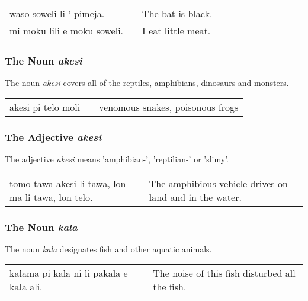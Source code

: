 \begin{supertabular}{p{5,5cm}|ll}
    waso soweli li ' pimeja.    &  & The bat is black.  \\
    mi moku lili e moku soweli. &  & I eat little meat. \\
\end{supertabular}

%
%
\subsubsection*{The Noun \textit{akesi}}
%
%
The noun \textit{akesi} covers all of the reptiles, amphibians, dinosaurs and monsters.

\begin{supertabular}{p{5,5cm}|ll}
    akesi pi telo moli &  & venomous snakes, poisonous frogs \\
\end{supertabular}

%
%
\subsubsection*{The Adjective \textit{akesi}}
%
%
The adjective \textit{akesi} means 'amphibian-', 'reptilian-' or 'slimy'.

\begin{supertabular}{p{5,5cm}|ll}
    tomo tawa akesi li tawa, lon ma li tawa, lon telo. &  & The amphibious vehicle drives on land and in the water. \\
\end{supertabular}

%
%
\subsubsection*{The Noun \textit{kala}}
%
%
The noun \textit{kala} designates fish and other aquatic animals.

\begin{supertabular}{p{5,5cm}|ll}
    kalama pi kala ni li pakala e kala ali. &  & The noise of this fish disturbed all the fish. \\
\end{supertabular}

